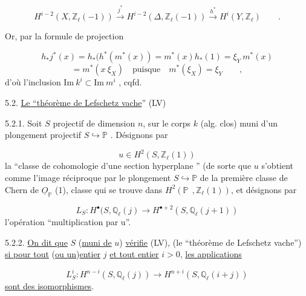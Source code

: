 \begin{equation*}
H^{i-2}(X,\mathbb{Z}_{\ell}(-1)) \stackrel{j^*}{\longrightarrow} H^{i-2}(\Delta,\mathbb{Z}_{\ell}(-1)) \stackrel{h^*}{\longrightarrow} H^i(Y,\mathbb{Z}_{\ell}) \qquad .
\end{equation*}


Or, par la formule de projection

\begin{equation*}
h_*j^*(x) = h_*(h^*(m^*(x)) = m^*(x)h_*(1) = \xi_Y\ m^*(x)
\end{equation*}
\begin{equation*}
= m^*(x\ \xi_X) \quad \mbox{puisque} \quad m^*(\xi_X) = \xi_Y \qquad ,
\end{equation*}
d'où l'inclusion $\mathrm{Im}\ k^i \subset \mathrm{Im}\ m^i$ , cqfd.


5.2.  \underline{Le ``théorème de Lefschetz vache}'' (LV)

5.2.1.  Soit $S$ projectif de dimension $n$, sur le corps $k$ (alg. clos) muni d'un plongement projectif $S \hookrightarrow \mathbb{P}$ . Désignons par

\begin{equation*}
u \in H^2(S,\mathbb{Z}_{\ell}(1))
\end{equation*}
la ``classe de cohomologie d'une section hyperplane '' (de sorte que $u$ s'obtient comme l'image réciproque par le plongement $S \hookrightarrow \mathbb{P}$ de la première classe de Chern de $\underline{O}_{\mathbb{P}}$ (1), classe qui se trouve dans $H^2(\mathbb{P}\ \ , \mathbb{Z}_{\ell}(1))$, et désignons par

\begin{equation*}
L_S : H^{\bullet}(S,\mathbb{Q}_{\ell}(j) \longrightarrow H^{\bullet+2}(S,\mathbb{Q}_{\ell}(j+1))
\end{equation*}
l'opération ``multiplication par u''.

5.2.2. \underline{On dit  que} $S$ (\underline{muni de} $u$) \underline{vérifie} (LV), (le ``théorème de Lefschetz vache'') \underline{si pour tout} (\underline{ou un})\underline{entier} $j$ \underline{et tout entier} $i > 0$, \underline{les applications}

\begin{equation*}
L_S^i : H^{n-i}(S,\mathbb{Q}_{\ell}(j)) \longrightarrow H^{n+i}(S,\mathbb{Q}_{\ell}(i+j))
\end{equation*}
\underline{sont des isomorphismes}.


